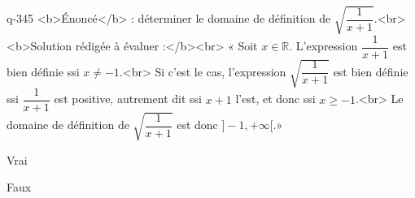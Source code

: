\begin{truefalse}{q-345}
<b>Énoncé</b> : déterminer le domaine de définition de $\sqrt{\dfrac{1}{x+1}}$.<br> <b>Solution rédigée à évaluer :</b><br>  « Soit $x\in\mathbb{R}$. L'expression $\dfrac{1}{x+1}$ est bien définie ssi $x\neq -1$.<br> Si c'est le cas, l'expression $\sqrt{\dfrac{1}{x+1}}$ est bien définie ssi $\dfrac{1}{x+1}$ est positive, autrement dit ssi $x+1$ l'est, et donc ssi $x\geq -1$.<br> Le domaine de définition de $\sqrt{\dfrac{1}{x+1}}$ est donc $]-1,+\infty[$.»
\item* Vrai
\item Faux
\end{truefalse}

